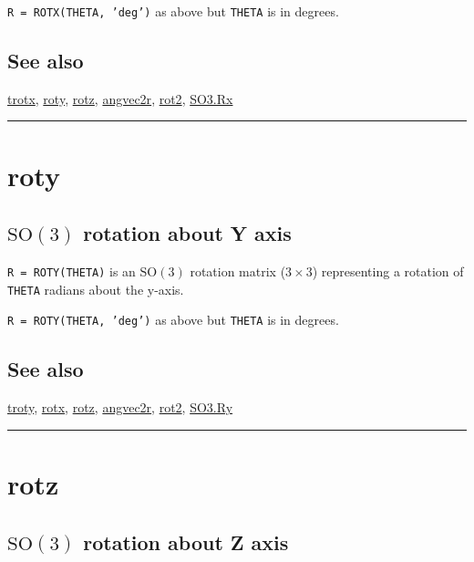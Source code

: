 \texttt{R = ROTX(THETA, 'deg')} as above but \texttt{THETA} is in degrees.


\subsection*{See also}


\hyperlink{trotx}{\color{blue} trotx}, \hyperlink{roty}{\color{blue} roty}, \hyperlink{rotz}{\color{blue} rotz}, \hyperlink{angvec2r}{\color{blue} angvec2r}, \hyperlink{rot2}{\color{blue} rot2}, \hyperlink{SO3.Rx}{\color{blue} SO3.Rx}

\vspace{1.5ex}\rule{\textwidth}{1mm}

\hypertarget{roty}{\section*{roty}}
\subsection*{$\mbox{SO}(3)$ rotation about Y axis}


\texttt{R = ROTY(THETA)} is an $\mbox{SO}(3)$ rotation matrix ($3 \times 3$) representing a rotation of \texttt{THETA}
radians about the y-axis.



\texttt{R = ROTY(THETA, 'deg')} as above but \texttt{THETA} is in degrees.


\subsection*{See also}


\hyperlink{troty}{\color{blue} troty}, \hyperlink{rotx}{\color{blue} rotx}, \hyperlink{rotz}{\color{blue} rotz}, \hyperlink{angvec2r}{\color{blue} angvec2r}, \hyperlink{rot2}{\color{blue} rot2}, \hyperlink{SO3.Ry}{\color{blue} SO3.Ry}

\vspace{1.5ex}\rule{\textwidth}{1mm}

\hypertarget{rotz}{\section*{rotz}}
\subsection*{$\mbox{SO}(3)$ rotation about Z axis}


